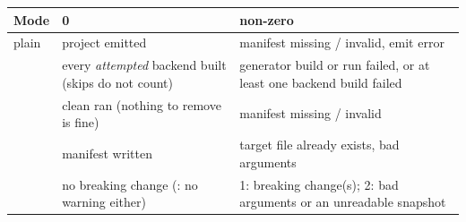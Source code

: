\begin{center}
\small
\begin{tabular}{@{}lL{4.6cm}L{5.6cm}@{}}
\toprule
\textbf{Mode} & \textbf{0} & \textbf{non-zero} \\
\midrule
plain & project emitted & manifest missing / invalid, emit error \\
 & every \emph{attempted} backend built (skips do not count) &
  generator build or run failed, or at least one backend build failed \\
 & clean ran (nothing to remove is fine) &
  manifest missing / invalid \\
 & manifest written & target file already exists, bad arguments \\
 & no breaking change (: no warning either) &
  1: breaking change(s); 2: bad arguments or an unreadable snapshot \\
\bottomrule
\end{tabular}
\end{center}

